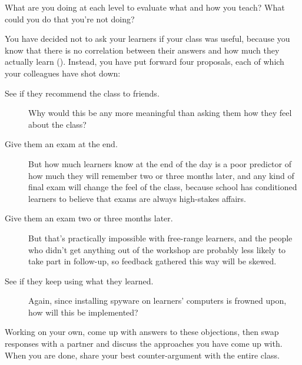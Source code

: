 What are you doing at each level to evaluate what and how you teach?
What could you do that you're not doing?


You have decided not to ask your learners if your class was useful,
because you know that there is no correlation between their answers
and how much they actually learn ().  Instead,
you have put forward four proposals, each of which your colleagues
have shot down:

\begin{description}

\item[See if they recommend the class to friends.] Why would this be
  any more meaningful than asking them how they feel about the class?

\item[Give them an exam at the end.] But how much learners know at the
  end of the day is a poor predictor of how much they will remember
  two or three months later, and any kind of final exam will change
  the feel of the class, because school has conditioned learners to
  believe that exams are always high-stakes affairs.

\item[Give them an exam two or three months later.]  But that's
  practically impossible with free-range learners, and the people who
  didn't get anything out of the workshop are probably less likely to
  take part in follow-up, so feedback gathered this way will be
  skewed.

\item[See if they keep using what they learned.] Again, since
  installing spyware on learners' computers is frowned upon, how will
  this be implemented?

\end{description}

Working on your own, come up with answers to these objections, then
swap responses with a partner and discuss the approaches you have come
up with.  When you are done, share your best counter-argument with the
entire class.
